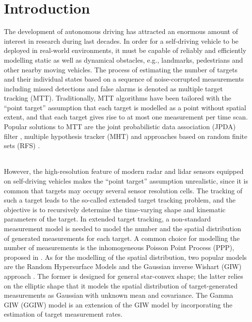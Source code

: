 \chapter{Introduction}
The development of autonomous driving has attracted an enormous amount of interest in research during last decades. In order for a self-driving vehicle to be deployed in real-world environments, it must be capable of reliably and efficiently modelling static as well as dynamical obstacles, e.g., landmarks, pedestrians and other nearby moving vehicles. The process of estimating the number of targets and their individual states based on a sequence of noise-corrupted measurements including missed detections and false alarms is denoted as multiple target tracking (MTT). Traditionally, MTT algorithms have been tailored with the ``point target'' assumption that each target is modelled as a point without spatial extent, and that each target gives rise to at most one measurement per time scan. Popular solutions to MTT are the joint probabilistic data association (JPDA) filter \cite{jpda}, multiple hypothesis tracker (MHT) \cite{mht} and approaches based on random finite sets (RFS) \cite{rfs}.

~\\
However, the high-resolution feature of modern radar and lidar sensors equipped on self-driving vehicles makes the ``point target'' assumption unrealistic, since it is common that targets may occupy several sensor resolution cells. The tracking of such a target leads to the so-called extended target tracking problem, and the objective is to recursively determine the time-varying shape and kinematic parameters of the target. In extended target tracking, a non-standard measurement model is needed to model the number and the spatial distribution of generated measurements for each target. A common choice for modelling the number of measurements is the inhomogeneous Poisson Point Process (PPP), proposed in \cite{ppp}. As for the modelling of the spatial distribution, two popular models are the Random Hypersurface Models \cite{hypersurface} and the Gaussian inverse Wishart (GIW) approach \cite{randomMatrix,randomMatrix2}. The former is designed for general star-convex shape; the latter relies on the elliptic shape that it models the spatial distribution of target-generated measurements as Gaussian with unknown mean and covariance. The Gamma GIW (GGIW) model \cite{phdextended,cphdextended} is an extension of the GIW model by incorporating the estimation of target measurement rates. 

